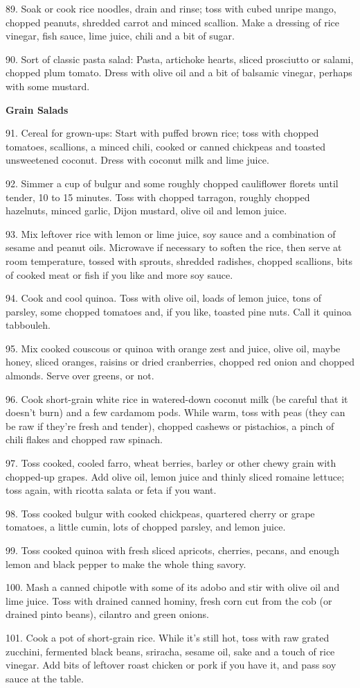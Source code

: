 \begin{recipe}
89. Soak or cook rice noodles, drain and rinse; toss with cubed unripe
mango, chopped peanuts, shredded carrot and minced scallion. Make a
dressing of rice vinegar, fish sauce, lime juice, chili and a bit of
sugar.

90. Sort of classic pasta salad: Pasta, artichoke hearts, sliced
prosciutto or salami, chopped plum tomato. Dress with olive oil and a
bit of balsamic vinegar, perhaps with some mustard.

\textbf{Grain Salads}

91. Cereal for grown-ups: Start with puffed brown rice; toss with
chopped tomatoes, scallions, a minced chili, cooked or canned
chickpeas and toasted unsweetened coconut. Dress with coconut milk and
lime juice.

92. Simmer a cup of bulgur and some roughly chopped cauliflower
florets until tender, 10 to 15 minutes. Toss with chopped tarragon,
roughly chopped hazelnuts, minced garlic, Dijon mustard, olive oil and
lemon juice.

93. Mix leftover rice with lemon or lime juice, soy sauce and a
combination of sesame and peanut oils. Microwave if necessary to
soften the rice, then serve at room temperature, tossed with sprouts,
shredded radishes, chopped scallions, bits of cooked meat or fish if
you like and more soy sauce.

94. Cook and cool quinoa. Toss with olive oil, loads of lemon juice,
tons of parsley, some chopped tomatoes and, if you like, toasted pine
nuts. Call it quinoa tabbouleh.

95. Mix cooked couscous or quinoa with orange zest and juice, olive
oil, maybe honey, sliced oranges, raisins or dried cranberries,
chopped red onion and chopped almonds. Serve over greens, or not.

96. Cook short-grain white rice in watered-down coconut milk (be
careful that it doesn't burn) and a few cardamom pods. While warm,
toss with peas (they can be raw if they're fresh and tender), chopped
cashews or pistachios, a pinch of chili flakes and chopped raw
spinach.

97. Toss cooked, cooled farro, wheat berries, barley or other chewy
grain with chopped-up grapes. Add olive oil, lemon juice and thinly
sliced romaine lettuce; toss again, with ricotta salata or feta if you
want.

98. Toss cooked bulgur with cooked chickpeas, quartered cherry or
grape tomatoes, a little cumin, lots of chopped parsley, and lemon
juice.

99. Toss cooked quinoa with fresh sliced apricots, cherries, pecans,
and enough lemon and black pepper to make the whole thing savory.

100. Mash a canned chipotle with some of its adobo and stir with olive
oil and lime juice. Toss with drained canned hominy, fresh corn cut
from the cob (or drained pinto beans), cilantro and green onions.

101. Cook a pot of short-grain rice. While it's still hot, toss with
raw grated zucchini, fermented black beans, sriracha, sesame oil, sake
and a touch of rice vinegar. Add bits of leftover roast chicken or
pork if you have it, and pass soy sauce at the table.

\end{recipe}
